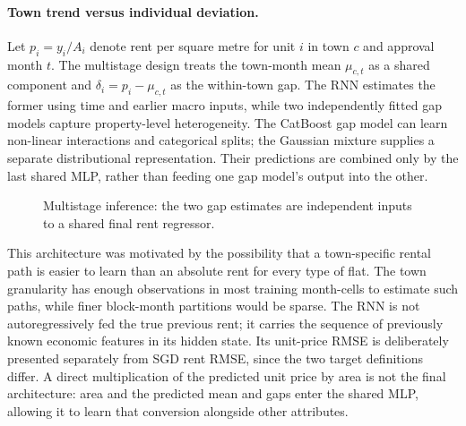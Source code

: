 \documentclass[10pt,a4paper]{article}
\begin{document}
\paragraph{Town trend versus individual deviation.}
Let $p_i=y_i/A_i$ denote rent per square metre for unit $i$ in town $c$ and approval month $t$. The multistage design treats the town-month mean $\mu_{c,t}$ as a shared component and $\delta_i=p_i-\mu_{c,t}$ as the within-town gap. The RNN estimates the former using time and earlier macro inputs, while two independently fitted gap models capture property-level heterogeneity. The CatBoost gap model can learn non-linear interactions and categorical splits; the Gaussian mixture supplies a separate distributional representation. Their predictions are combined only by the last shared MLP, rather than feeding one gap model's output into the other.

\begin{figure}[htbp]\centering
{}
\caption{Multistage inference: the two gap estimates are independent inputs to a shared final rent regressor.}\label{fig:stackdiagram}
\end{figure}

This architecture was motivated by the possibility that a town-specific rental path is easier to learn than an absolute rent for every type of flat. The town granularity has enough observations in most training month-cells to estimate such paths, while finer block-month partitions would be sparse. The RNN is not autoregressively fed the true previous rent; it carries the sequence of previously known economic features in its hidden state. Its unit-price RMSE is deliberately presented separately from SGD rent RMSE, since the two target definitions differ. A direct multiplication of the predicted unit price by area is not the final architecture: area and the predicted mean and gaps enter the shared MLP, allowing it to learn that conversion alongside other attributes.
\end{document}
